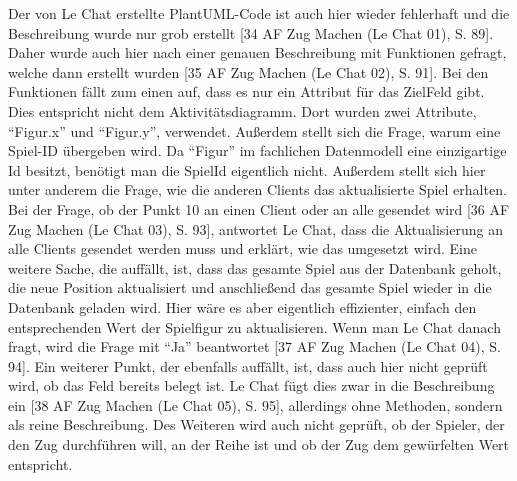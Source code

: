 Der von Le Chat erstellte PlantUML-Code ist auch hier wieder fehlerhaft und die Beschreibung wurde nur grob erstellt [34 AF Zug Machen (Le Chat 01), S. 89]. Daher wurde 
auch hier nach einer genauen Beschreibung mit Funktionen gefragt, welche dann erstellt wurden [35 AF Zug Machen (Le Chat 02), S. 91]. Bei den Funktionen fällt zum einen auf, 
dass es nur ein Attribut für das ZielFeld gibt. Dies entspricht nicht dem Aktivitätsdiagramm. Dort wurden zwei Attribute, ``Figur.x'' 
und ``Figur.y'', verwendet. Außerdem stellt sich die Frage, warum eine Spiel-ID übergeben wird. Da ``Figur'' im fachlichen Datenmodell eine 
einzigartige Id besitzt, benötigt man die SpielId eigentlich nicht. Außerdem stellt sich hier unter anderem die Frage, wie die anderen 
Clients das aktualisierte Spiel erhalten. Bei der Frage, ob der Punkt 10 an einen Client oder an alle gesendet wird [36 AF Zug Machen (Le Chat 03), S. 93], antwortet Le 
Chat, dass die Aktualisierung an alle Clients gesendet werden muss und erklärt, wie das umgesetzt wird. Eine weitere Sache, die 
auffällt, ist, dass das gesamte Spiel aus der Datenbank geholt, die neue Position aktualisiert und anschließend das gesamte 
Spiel wieder in die Datenbank geladen wird. Hier wäre es aber eigentlich effizienter, einfach den entsprechenden Wert der Spielfigur 
zu aktualisieren. Wenn man Le Chat danach fragt, wird die Frage mit ``Ja'' beantwortet [37 AF Zug Machen (Le Chat 04), S. 94]. Ein weiterer Punkt, der ebenfalls auffällt, ist, dass auch 
hier nicht geprüft wird, ob das Feld bereits belegt ist. Le Chat fügt dies zwar in die Beschreibung ein [38 AF Zug Machen (Le Chat 05), S. 95], allerdings ohne Methoden, 
sondern als reine Beschreibung. Des Weiteren wird auch nicht geprüft, ob der Spieler, der den Zug durchführen will, an der Reihe ist 
und ob der Zug dem gewürfelten Wert entspricht.

